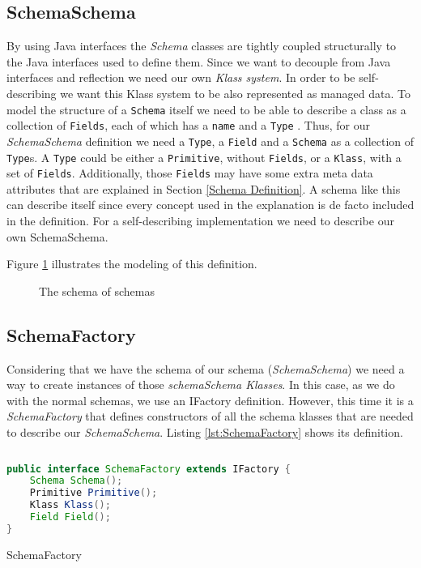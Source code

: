 \subsection{SchemaSchema}\label{sec:SchemaSchema}
By using Java interfaces the \textit{Schema} classes are tightly coupled structurally to the Java interfaces used to define them.
Since we want to decouple from Java interfaces and reflection we need our own \textit{Klass system}.
In order to be self-describing we want this Klass system to be also represented as managed data. 
To model the structure of a \texttt{Schema} itself we need to be able to describe a class as a collection of \texttt{Fields}, each of which has a \texttt{name} and a \texttt{Type} \cite{loh2012managed}. 
Thus, for our \textit{SchemaSchema} definition we need a \texttt{Type}, a \texttt{Field} and a \texttt{Schema} as a collection of \texttt{Type}s. 
A \texttt{Type} could be either a \texttt{Primitive}, without \texttt{Fields}, or a \texttt{Klass}, with a set of \texttt{Fields}.
Additionally, those \texttt{Fields} may have some extra meta data attributes that are explained in Section \ref{Schema Definition}.
A schema like this can describe itself since every concept used in the explanation is de facto included in the definition.
For a self-describing implementation we need to describe our own SchemaSchema. 

Figure \ref{fig:SchemaSchema_definition} illustrates the modeling of this definition.

\begin{figure}[H]
	\centering
  	\caption{The schema of schemas}
  	\label{fig:SchemaSchema_definition}
\end{figure}

\subsection{SchemaFactory}\label{sec:SchemaFactory}
Considering that we have the schema of our schema (\textit{SchemaSchema}) we need a way to create instances of those \textit{schemaSchema Klasses}.
In this case, as we do with the normal schemas, we use an IFactory definition.
However, this time it is a \textit{SchemaFactory} that defines constructors of all the schema klasses that are needed to describe our \textit{SchemaSchema}.
Listing \ref{lst:SchemaFactory} shows its definition.

\begin{sourcecode} [H]
	\begin{lstlisting}[language=Java, escapechar=|]
public interface SchemaFactory extends IFactory {
    Schema Schema();
    Primitive Primitive();
    Klass Klass();
    Field Field();
}
	\end{lstlisting}
	\caption{SchemaFactory}
	\label{lst:SchemaFactory}
\end{sourcecode}

